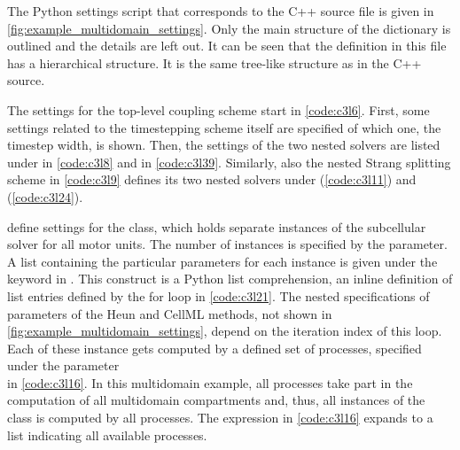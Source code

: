 The Python settings script that corresponds to the C++ source file is given in \cref{fig:example_multidomain_settings}. Only the main structure of the  dictionary is outlined and the details are left out. It can be seen that the definition in this file has a hierarchical structure. It is the same tree-like structure as in the C++ source.

The settings for the top-level coupling scheme start in \cref{code:c3l6}. First, some settings related to the timestepping scheme itself are specified of which one, the timestep width, is shown. Then, the settings of the two nested solvers are listed under  in \cref{code:c3l8} and  in \cref{code:c3l39}. Similarly, also the nested Strang splitting scheme in \cref{code:c3l9} defines its two nested solvers under  (\cref{code:c3l11}) and  (\cref{code:c3l24}).

 define settings for the  class, which holds separate instances of the subcellular solver for all motor units.
The number of instances is specified by the  parameter. A list containing the particular parameters for each instance is given under the keyword  in . This construct is a Python list comprehension, an inline definition of list entries defined by the for loop in \cref{code:c3l21}. The nested specifications of parameters of the Heun and CellML methods, not shown in \cref{fig:example_multidomain_settings}, depend on the iteration index  of this loop. 
Each of these instance gets computed by a defined set of processes, specified under the parameter \\ in \cref{code:c3l16}. In this multidomain example, all processes take part in the computation of all multidomain compartments and, thus, all instances of the  class is computed by all processes. The expression in \cref{code:c3l16} expands to a list \code{[0,1,2,...]} indicating all available processes.

